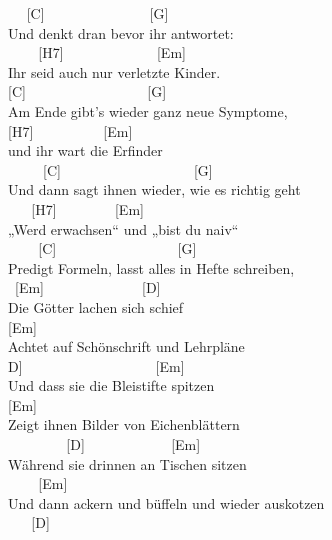 \documentclass[
  letterpaper,
  twoside=false]{scrbook}
\begin{document}
~ ~{[}C{]} ~ ~ ~ ~ ~ ~ ~ ~ ~{[}G{]}\\
Und denkt dran bevor ihr antwortet:\\
\hspace*{0.333em} ~ ~ ~{[}H7{]} ~ ~ ~ ~ ~ ~ ~ ~{[}Em{]}\\
Ihr seid auch nur verletzte Kinder.\\
\hspace*{0.333em} {[}C{]} ~ ~ ~ ~ ~ ~ ~ ~ ~ ~ {[}G{]}\\
Am Ende gibt's wieder ganz neue Symptome,\\
\hspace*{0.333em} {[}H7{]} ~ ~ ~ ~ ~ ~{[}Em{]}\\
und ihr wart die Erfinder\\
\hspace*{0.333em} ~ ~ ~ {[}C{]} ~ ~ ~ ~ ~ ~ ~ ~ ~ ~ ~ {[}G{]}\\
Und dann sagt ihnen wieder, wie es richtig geht\\
\hspace*{0.333em} ~ ~ {[}H7{]} ~ ~ ~ ~ ~{[}Em{]}\\
„Werd erwachsen`` und „bist du naiv``\\
\hspace*{0.333em} ~ ~ ~{[}C{]} ~ ~ ~ ~ ~ ~ ~ ~ ~ ~ {[}G{]}\\
Predigt Formeln, lasst alles in Hefte schreiben,\\
\hspace*{0.333em} ~{[}Em{]} ~ ~ ~ ~ ~ ~ ~ ~ {[}D{]}\\
Die Götter lachen sich schief\\
{[}Em{]}\\
Achtet auf Schönschrift und Lehrpläne\\
\hspace*{0.333em}{[}D{]} ~ ~ ~ ~ ~ ~ ~ ~ ~ ~ ~ {[}Em{]}\\
Und dass sie die Bleistifte spitzen\\
{[}Em{]} ~ ~ ~ ~ ~ ~ ~\\
Zeigt ihnen Bilder von Eichenblättern\\
\hspace*{0.333em} ~ ~ ~ ~ ~ {[}D{]} ~ ~ ~ ~ ~ ~ ~ {[}Em{]}\\
Während sie drinnen an Tischen sitzen\\
\hspace*{0.333em} ~ ~ ~{[}Em{]}\\
Und dann ackern und büffeln und wieder auskotzen\\
\hspace*{0.333em} ~ ~ {[}D{]}\\
\end{document}
